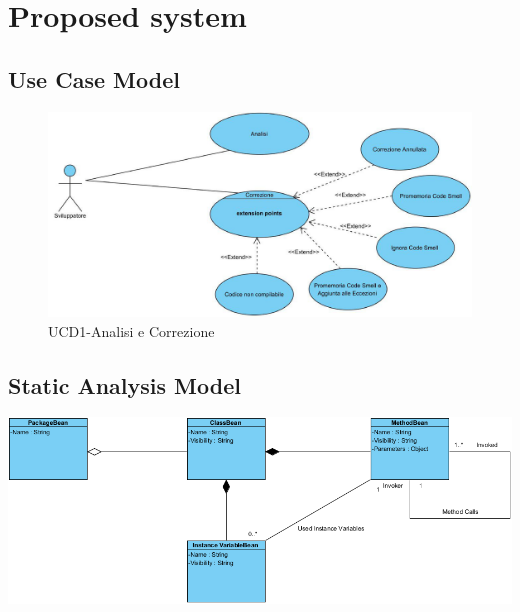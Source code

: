 \documentclass[11pt]{article}
\begin{document}
	\newpage
	
	\section{Proposed system}
		
	    
	    
	    \subsection{Use Case Model}	
	    
	    \begin{figure}[h!]
	    	\includegraphics[width=\columnwidth]{UseCaseDiagramProposed.jpg}
	    	\caption{UCD1-Analisi e Correzione}
	    \end{figure}
    	
	    
	    \vspace{1cm}
	    
	    
	    
	    \subsection{Static Analysis Model}
	    
	    		\includegraphics[width=\columnwidth]{classDiagram.png}
	    	
	    		
	    		
\end{document}
